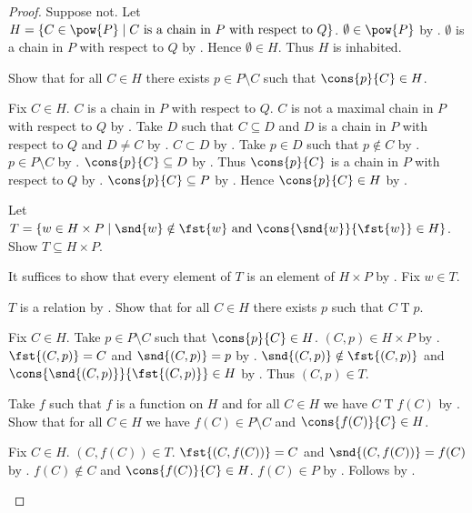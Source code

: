 \begin{proof}
    Suppose not.
    Let $H=\{C\in\pow{P}\mid \text{$C$ is a chain in $P$ with respect to $Q$}\}$.
    $\emptyset\in\pow{P}$ by .
    $\emptyset$ is a chain in $P$ with respect to $Q$
        by .
    Hence $\emptyset\in H$.
    Thus $H$ is inhabited.

    Show that for all $C\in H$ there exists $p\in P\setminus C$ such that $\cons{p}{C}\in H$.
    \begin{subproof}
        Fix $C\in H$.
        $C$ is a chain in $P$ with respect to $Q$.
        $C$ is not a maximal chain in $P$ with respect to $Q$ by \auto.
        Take $D$ such that $C\subseteq D$ and $D$ is a chain in $P$ with respect to $Q$ and $D\neq C$
            by .
        $C\subset D$ by .
        Take $p\in D$ such that $p\notin C$ by .
        $p\in P\setminus C$ by .
        $\cons{p}{C}\subseteq D$ by .
        Thus $\cons{p}{C}$ is a chain in $P$ with respect to $Q$
            by .
        $\cons{p}{C}\subseteq P$ by .
        Hence $\cons{p}{C}\in H$ by .
    \end{subproof}

    Let $T=\{w\in H\times P\mid \text{$\snd{w}\notin\fst{w}$ and $\cons{\snd{w}}{\fst{w}}\in H$}\}$.
    Show $T\subseteq H\times P$.
    \begin{subproof}
        It suffices to show that every element of $T$ is an element of $H\times P$
            by .
        Fix $w\in T$.
    \end{subproof}
    $T$ is a relation by .
    Show that for all $C\in H$ there exists $p$ such that $C\mathrel{T}p$.
    \begin{subproof}
        Fix $C\in H$.
        Take $p\in P\setminus C$ such that $\cons{p}{C}\in H$.
        $(C,p)\in H\times P$ by .
        $\fst{(C,p)}=C$ and $\snd{(C,p)}=p$ by .
        $\snd{(C,p)}\notin\fst{(C,p)}$ and
            $\cons{\snd{(C,p)}}{\fst{(C,p)}}\in H$
            by .
        Thus $(C,p)\in T$.
    \end{subproof}
    Take $f$ such that $f$ is a function on $H$ and for all $C\in H$ we have $C\mathrel{T}f(C)$
        by .
    Show that for all $C\in H$ we have $f(C)\in P\setminus C$ and $\cons{f(C)}{C}\in H$.
    \begin{subproof}
        Fix $C\in H$.
        $(C,f(C))\in T$.
        $\fst{(C,f(C))}=C$ and $\snd{(C,f(C))}=f(C)$ by .
        $f(C)\notin C$ and $\cons{f(C)}{C}\in H$.
        $f(C)\in P$ by .
        Follows by .
    \end{subproof}


\end{proof}
